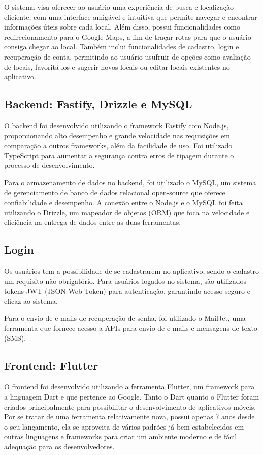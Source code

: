 O sistema visa oferecer ao usuário uma experiência de busca e localização eficiente, com uma interface amigável e intuitiva que permite navegar e encontrar informações úteis sobre cada local. Além disso, possui funcionalidades como redirecionamento para o Google Maps, a fim de traçar rotas para que o usuário consiga chegar ao local. Também inclui funcionalidades de cadastro, login e recuperação de conta, permitindo ao usuário usufruir de opções como avaliação de locais, favoritá-los e sugerir novos locais ou editar locais existentes no aplicativo.


\subsection{Backend: Fastify, Drizzle e MySQL}
O backend foi desenvolvido utilizando o framework Fastify com Node.js, proporcionando alto desempenho e grande velocidade nas requisições em comparação a outros frameworks, além da facilidade de uso. Foi utilizado TypeScript para aumentar a segurança contra erros de tipagem durante o processo de desenvolvimento.

Para o armazenamento de dados no backend, foi utilizado o MySQL, um sistema de gerenciamento de banco de dados relacional open-source que oferece confiabilidade e desempenho. A conexão entre o Node.js e o MySQL foi feita utilizando o Drizzle, um mapeador de objetos (ORM) que foca na velocidade e eficiência na entrega de dados entre as duas ferramentas.

\subsection{Login}
Os usuários tem a possibilidade de se cadastrarem no aplicativo, sendo o cadastro um requisito não obrigatório. Para usuários logados no sistema, são utilizados tokens JWT (JSON Web Token) para autenticação, garantindo acesso seguro e eficaz ao sistema.

Para o envio de e-mails de recuperação de senha, foi utilizado o MailJet, uma ferramenta que fornece acesso a APIs para envio de e-mails e mensagens de texto (SMS).

\subsection{Frontend: Flutter}
O frontend foi desenvolvido utilizando a ferramenta Flutter, um framework para a linguagem Dart e que pertence ao Google. Tanto o Dart quanto o Flutter foram criados principalmente para possibilitar o desenvolvimento de aplicativos móveis. Por se tratar de uma ferramenta relativamente nova, possui apenas 7 anos desde o seu lançamento, ela se aproveita de vários padrões já bem estabelecidos em outras linguagens e frameworks para criar um ambiente moderno e de fácil adequação para os desenvolvedores.

